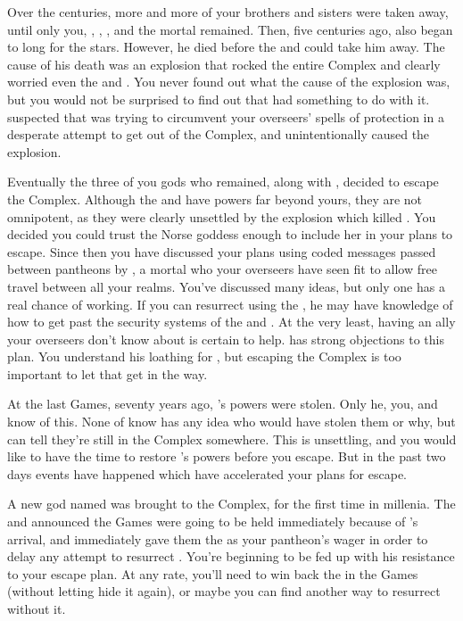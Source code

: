 \documentclass[char]{guardians}
\begin{document}
Over the centuries, more and more of your brothers and sisters were taken away, until only you, \cOsiris{}, \cAnubis{}, \cSet{}, and the mortal \cEgyptianHuman{} remained. Then, five centuries ago, \cSet{} also began to long for the stars. However, he died before the \cWarden{} and \cCaretaker{} could take him away. The cause of his death was an explosion that rocked the entire Complex and clearly worried even the \cWarden{} and \cCaretaker{}. You never found out what the cause of the explosion was, but you would not be surprised to find out that \cOsiris{} had something to do with it. \cAnubis{} suspected that \cSet{} was trying to circumvent your overseers' spells of protection in a desperate attempt to get out of the Complex, and unintentionally caused the explosion.

Eventually the three of you gods who remained, along with \cEgyptianHuman{}, decided to escape the Complex. Although the \cWarden{} and \cCaretaker{} have powers far beyond yours, they are not omnipotent, as they were clearly unsettled by the explosion which killed \cSet{}. You decided you could trust the Norse goddess \cHel{} enough to include her in your plans to escape. Since then you have discussed your plans using coded messages passed between pantheons by \cJascha{}, a mortal who your overseers have seen fit to allow free travel between all your realms. You've discussed many ideas, but only one has a real chance of working. If you can resurrect \cSet{} using the \iNecro{\MYname}, he may have knowledge of how to get past the security systems of the \cWarden{} and \cCaretaker{}. At the very least, having an ally your overseers don't know about is certain to help. \cOsiris{} has strong objections to this plan. You understand his loathing for \cSet{}, but escaping the Complex is too important to let that get in the way.


At the last Games, seventy years ago, \cOsiris{}'s powers were stolen. Only he, you, and \cAnubis{} know of this. None of know has any idea who would have stolen them or why, but \cOsiris{} can tell they're still in the Complex somewhere. This is unsettling, and you would like to have the time to restore \cOsiris{}'s powers before you escape. But in the past two days events have happened which have accelerated your plans for escape.

A new god named \cUnity{} was brought to the Complex, for the first time in millenia. The \cWarden{} and \cCaretaker{} announced the Games were going to be held immediately because of \cUnity{}'s arrival, and \cOsiris{} immediately gave them the \iNecro{\MYname} as your pantheon's wager in order to delay any attempt to resurrect \cSet{}. You're beginning to be fed up with his resistance to your escape plan. At any rate, you'll need to win back the \iNecro{\MYname} in the Games (without letting \cOsiris{} hide it again), or maybe you can find another way to resurrect \cSet{} without it.
\end{document}
